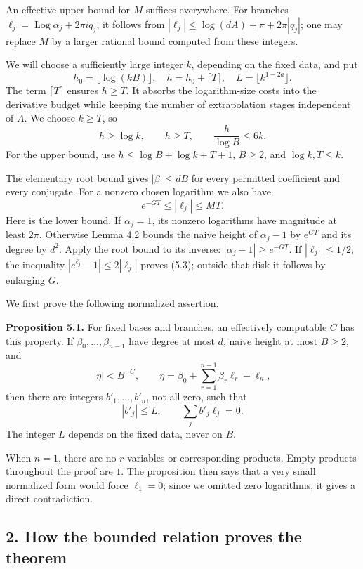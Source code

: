 \documentclass[
  11pt,
  a4paper,
]{article}
\begin{document}
An effective upper bound for \(M\) suffices everywhere. For branches
\(\ell_j=\operatorname{Log}\alpha_j+2\pi iq_j\), it follows from
\(|\ell_j|\le\log(dA)+\pi+2\pi|q_j|\); one may replace \(M\) by a larger
rational bound computed from these integers.

We will choose a sufficiently large integer \(k\), depending on the
fixed data, and put \[
h_0=\lfloor\log(kB)\rfloor,\quad h=h_0+\lceil T\rceil,\quad
L=\lfloor k^{1-2a}\rfloor. \tag{5.1}
\] The term \(\lceil T\rceil\) ensures \(h\ge T\). It absorbs the
logarithm-size costs into the derivative budget while keeping the number
of extrapolation stages independent of \(A\). We choose \(k\ge T\), so
\[
h\ge\log k,\qquad h\ge T,\qquad
\frac h{\log B}\le6k. \tag{5.2}
\] For the upper bound, use \(h\le\log B+\log k+T+1\), \(B\ge2\), and
\(\log k,T\le k\).

The elementary root bound gives \(|\beta|\le dB\) for every permitted
coefficient and every conjugate. For a nonzero chosen logarithm we also
have \[
e^{-G T}\le|\ell_j|\le MT. \tag{5.3}
\] Here is the lower bound. If \(\alpha_j=1\), its nonzero logarithms
have magnitude at least \(2\pi\). Otherwise Lemma 4.2 bounds the naive
height of \(\alpha_j-1\) by \(e^{G T}\) and its degree by \(d^2\). Apply
the root bound to its inverse: \(|\alpha_j-1|\ge e^{-G T}\). If
\(|\ell_j|\le1/2\), the inequality \(|e^{\ell_j}-1|\le2|\ell_j|\) proves
(5.3); outside that disk it follows by enlarging \(G\).

We first prove the following normalized assertion.

\textbf{Proposition 5.1.} For fixed bases and branches, an effectively
computable \(C\) has this property. If \(\beta_0,\ldots,\beta_{n-1}\)
have degree at most \(d\), naive height at most \(B\ge2\), and \[
|\eta|<B^{-C},\qquad
\eta=\beta_0+\sum_{r=1}^{n-1}\beta_r\ell_r-\ell_n, \tag{5.4}
\] then there are integers \(b'_1,\ldots,b'_n\), not all zero, such that
\[
|b'_j|\le L,\qquad \sum_jb'_j\ell_j=0. \tag{5.5}
\] The integer \(L\) depends on the fixed data, never on \(B\).

When \(n=1\), there are no \(r\)-variables or corresponding products.
Empty products throughout the proof are \(1\). The proposition then says
that a very small normalized form would force \(\ell_1=0\); since we
omitted zero logarithms, it gives a direct contradiction.

\subsection{2. How the bounded relation proves the
theorem}\label{how-the-bounded-relation-proves-the-theorem}
\end{document}
